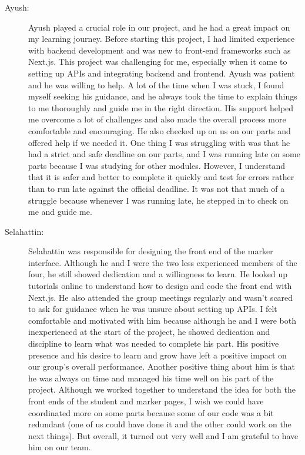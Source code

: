\documentclass[a4paper, 12pt]{article}
\begin{document}
\begin{enumerate}
\begin{description}
            \item[Ayush: ] Ayush played a crucial role in our project, and he had a great impact on my learning journey. Before starting this project, I had limited experience with backend development and was new to front-end frameworks such as Next.js. This project was challenging for me, especially when it came to setting up APIs and integrating backend and frontend. Ayush was patient and he was willing to help. A lot of the time when I was stuck, I found myself seeking his guidance, and he always took the time to explain things to me thoroughly and guide me in the right direction. His support helped me overcome a lot of challenges and also made the overall process more comfortable and encouraging. He also checked up on us on our parts and offered help if we needed it. One thing I was struggling with was that he had a strict and safe deadline on our parts, and I was running late on some parts because I was studying for other modules. However, I understand that it is safer and better to complete it quickly and test for errors rather than to run late against the official deadline. It was not that much of a struggle because whenever I was running late, he stepped in to check on me and guide me.
            \item[Selahattin: ] Selahattin was responsible for designing the front end of the marker interface. Although he and I were the two less experienced members of the four, he still showed dedication and a willingness to learn. He looked up tutorials online to understand how to design and code the front end with Next.js. He also attended the group meetings regularly and wasn’t scared to ask for guidance when he was unsure about setting up APIs. I felt comfortable and motivated with him because although he and I were both inexperienced at the start of the project, he showed dedication and discipline to learn what was needed to complete his part. His positive presence and his desire to learn and grow have left a positive impact on our group’s overall performance. Another positive thing about him is that he was always on time and managed his time well on his part of the project. Although we worked together to understand the idea for both the front ends of the student and marker pages, I wish we could have coordinated more on some parts because some of our code was a bit redundant (one of us could have done it and the other could work on the next things). But overall, it turned out very well and I am grateful to have him on our team.
        \end{description}

\end{enumerate}
\end{document}
